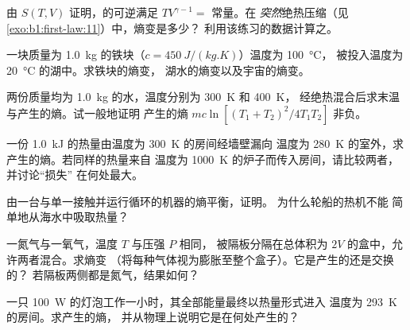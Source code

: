 \begin{exercise}[$\star$]\label{exo:b1:second-law-entropy:4}
由 $S(T, V)$ 证明，的可逆满足
$TV^{\gamma - 1} = $ 常量。在
\emph{突然}绝热压缩（见\cref{exo:b1:first-law:11}）中，熵变是多少？
利用该练习的数据计算之。
\end{exercise}

\begin{exercise}[$\star\star$]\label{exo:b1:second-law-entropy:5}
一块质量为 \qty{1.0}{kg} 的铁块（$c = \qty{450}{J/(kg.K)}$）温度为 \qty{100}{\degreeCelsius}，
被投入温度为 \qty{20}{\degreeCelsius} 的湖中。求铁块的熵变，
湖水的熵变以及宇宙的熵变。
\end{exercise}

\begin{exercise}[$\star\star$]\label{exo:b1:second-law-entropy:6}
两份质量均为 \qty{1.0}{kg} 的水，温度分别为 \qty{300}{K} 和 \qty{400}{K}，
经绝热混合后求末温与产生的熵。试一般地证明
产生的熵 $mc\ln[(T_1 + T_2)^2/4T_1T_2]$ 非负。
\end{exercise}

\begin{exercise}[$\star\star$]\label{exo:b1:second-law-entropy:7}
一份 \qty{1.0}{kJ} 的热量由温度为 \qty{300}{K} 的房间经墙壁漏向
温度为 \qty{280}{K} 的室外，求产生的熵。若同样的热量来自
温度为 \qty{1000}{K} 的炉子而传入房间，请比较两者，并讨论“损失”
在何处最大。
\end{exercise}

\begin{exercise}[$\star\star$]\label{exo:b1:second-law-entropy:8}
由一台与单一接触并运行循环的机器的熵平衡，证明。
为什么轮船的热机不能
简单地从海水中吸取热量？
\end{exercise}

\begin{exercise}[$\star\star$]\label{exo:b1:second-law-entropy:9}
一氮气与一氧气，温度 $T$ 与压强 $P$ 相同，
被隔板分隔在总体积为 $2V$ 的盒中，允许两者混合。求熵变
（将每种气体视为膨胀至整个盒子）。它是产生的还是交换的？
若隔板两侧都是氮气，结果如何？
\end{exercise}

\begin{exercise}[$\star\star\star$]\label{exo:b1:second-law-entropy:10}
一只 \qty{100}{W} 的灯泡工作一小时，其全部能量最终以热量形式进入
温度为 \qty{293}{K} 的房间。求产生的熵，
并从物理上说明它是在何处产生的？
\end{exercise}

